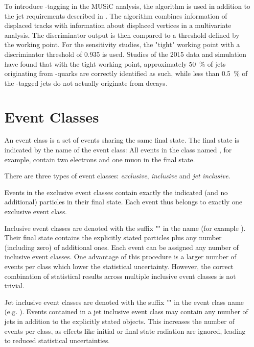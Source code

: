 To introduce \Pqb-tagging in the \ac{MUSiC} analysis, the  algorithm\cite{CMSCollaboration:Identificationbquark} is used in addition to the jet requirements described in . The algorithm combines information of displaced tracks with information about displaced vertices in a multivariate analysis. The discriminator output is then compared to a threshold defined by the working point.
For the sensitivity studies, the "tight" working point with a discriminator threshold of \num{0.935} is used. Studies of the 2015 data and simulation have found that with the tight working point, approximately \SI{50}{\percent} of jets originating from \Pqb-quarks are correctly identified as such, while less than \SI{0.5}{\percent} of the \Pqb-tagged jets do not actually originate from \Pqb decays\cite{CMS:CMS-AN-2016-036}.


\section{Event Classes}
\label{sec:event_classes}

An event class is a set of events sharing the same final state. The final state is indicated by the name of the event class: All events in the class named \eventclass{2\Pe + 1\Pmu}, for example, contain two electrons and one muon in the final state.

There are three types of event classes: \emph{exclusive}, \emph{inclusive} and \emph{jet inclusive}.

Events in the exclusive event classes contain exactly the indicated (and no additional) particles in their final state. Each event thus belongs to exactly one exclusive event class.

Inclusive event classes are denoted with the suffix "" in the name (for example ). Their final state contains the explicitly stated particles plus any number (including zero) of additional ones.  Each event can be assigned any number of inclusive event classes. One advantage of this procedure is a larger number of events per class which lower the statistical uncertainty. However, the correct combination of statistical results across multiple inclusive event classes is not trivial.

Jet inclusive event classes are denoted with the suffix "" in the event class name (e.g. ). Events contained in a jet inclusive event class may contain any number of jets in addition to the explicitly stated objects. This increases the number of events per class, as effects like initial or final state radiation are ignored, leading to reduced statistical uncertainties.


